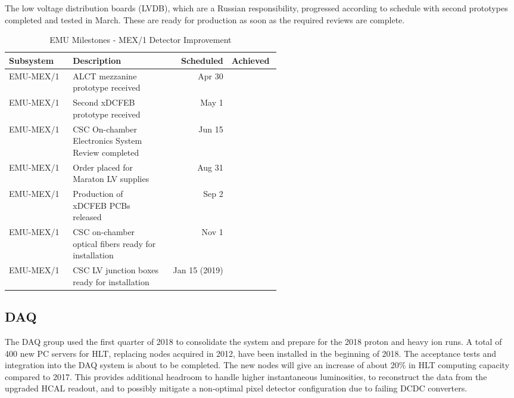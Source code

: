 \documentclass[12pt]{article}
\begin{document}
The low voltage distribution boards (LVDB), which are a Russian responsibility, progressed according to schedule with second prototypes completed and tested in March.  These are ready for production as soon as the required reviews are complete.


 \begin{table}[htp]
\caption{EMU Milestones - MEX/1 Detector Improvement}
\begin{center}
\def\arraystretch{1.5}

\begin{tabular}{|l|p{0.35\linewidth}|r|p{0.18\linewidth}|}
\hline
Subsystem&Description&Scheduled&Achieved\\
\hline
EMU-MEX/1 & ALCT mezzanine prototype received  & Apr 30 &  \\
\hline
EMU-MEX/1& Second xDCFEB prototype received & May 1 &  \\
\hline
EMU-MEX/1 & CSC On-chamber Electronics System Review completed & Jun 15 &  \\
\hline
EMU-MEX/1 & Order placed for Maraton LV supplies  & Aug 31 &  \\
\hline
EMU-MEX/1 & Production of xDCFEB PCBs released  & Sep 2 &  \\
\hline
EMU-MEX/1 & CSC on-chamber optical fibers ready for installation & Nov 1 &  \\
\hline
EMU-MEX/1 & CSC LV junction boxes ready for installation & Jan 15 (2019) &  \\
\hline
\end{tabular}
\end{center}
\label{EMUMilestones-MEX1}
\end{table}%



\subsection{DAQ}
The DAQ group used the first quarter of 2018 to consolidate the system and prepare for the 2018 proton and heavy ion runs. A total of 400 new PC servers for HLT, replacing nodes acquired in 2012, have been installed in the beginning of 2018. The acceptance tests and integration into the DAQ system is about to be completed. The new nodes will give an increase of about 20\% in HLT computing capacity compared to 2017. This provides additional headroom to handle higher instantaneous luminosities, to reconstruct the data from the upgraded HCAL readout, and to possibly mitigate a non-optimal pixel detector configuration due to failing DCDC converters.
\end{document}
